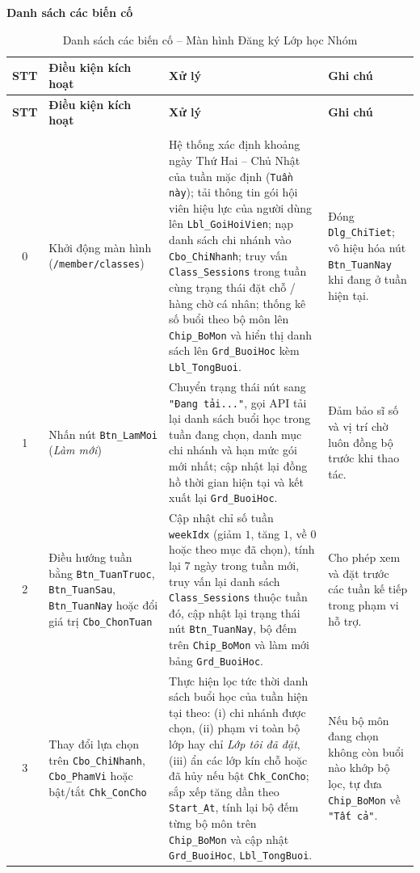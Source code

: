 \documentclass[a4paper,12pt]{article}
\begin{document}
\par\medskip\noindent\textbf{Danh sách các biến cố}\par\smallskip
{\footnotesize
\setlength{\tabcolsep}{4pt}
\begin{longtable}{|c|L{3.5cm}|L{7.8cm}|L{3.5cm}|}
\hline
\textbf{STT} & \textbf{Điều kiện kích hoạt} & \textbf{Xử lý} & \textbf{Ghi chú} \\
\hline
\endfirsthead
\hline
\textbf{STT} & \textbf{Điều kiện kích hoạt} & \textbf{Xử lý} & \textbf{Ghi chú} \\
\hline
\endhead
\hline
\endfoot
\hline
\caption{Danh sách các biến cố -- Màn hình Đăng ký Lớp học Nhóm} \\
\endlastfoot

0 & Khởi động màn hình (\texttt{/member/classes}) &
Hệ thống xác định khoảng ngày Thứ Hai -- Chủ Nhật của tuần mặc định (\texttt{Tuần này}); tải thông tin gói hội viên hiệu lực của người dùng lên \texttt{Lbl\_GoiHoiVien}; nạp danh sách chi nhánh vào \texttt{Cbo\_ChiNhanh}; truy vấn \texttt{Class\_Sessions} trong tuần cùng trạng thái đặt chỗ / hàng chờ cá nhân; thống kê số buổi theo bộ môn lên \texttt{Chip\_BoMon} và hiển thị danh sách lên \texttt{Grd\_BuoiHoc} kèm \texttt{Lbl\_TongBuoi}. &
Đóng \texttt{Dlg\_ChiTiet}; vô hiệu hóa nút \texttt{Btn\_TuanNay} khi đang ở tuần hiện tại. \\ \hline

1 & Nhấn nút \texttt{Btn\_LamMoi} (\textit{Làm mới}) &
Chuyển trạng thái nút sang \texttt{"Đang tải..."}, gọi API tải lại danh sách buổi học trong tuần đang chọn, danh mục chi nhánh và hạn mức gói mới nhất; cập nhật lại đồng hồ thời gian hiện tại và kết xuất lại \texttt{Grd\_BuoiHoc}. &
Đảm bảo sĩ số và vị trí chờ luôn đồng bộ trước khi thao tác. \\ \hline

2 & Điều hướng tuần bằng \texttt{Btn\_TuanTruoc}, \texttt{Btn\_TuanSau}, \texttt{Btn\_TuanNay} hoặc đổi giá trị \texttt{Cbo\_ChonTuan} &
Cập nhật chỉ số tuần \texttt{weekIdx} (giảm $1$, tăng $1$, về $0$ hoặc theo mục đã chọn), tính lại 7 ngày trong tuần mới, truy vấn lại danh sách \texttt{Class\_Sessions} thuộc tuần đó, cập nhật lại trạng thái nút \texttt{Btn\_TuanNay}, bộ đếm trên \texttt{Chip\_BoMon} và làm mới bảng \texttt{Grd\_BuoiHoc}. &
Cho phép xem và đặt trước các tuần kế tiếp trong phạm vi hỗ trợ. \\ \hline

3 & Thay đổi lựa chọn trên \texttt{Cbo\_ChiNhanh}, \texttt{Cbo\_PhamVi} hoặc bật/tắt \texttt{Chk\_ConCho} &
Thực hiện lọc tức thời danh sách buổi học của tuần hiện tại theo: (i) chi nhánh được chọn, (ii) phạm vi toàn bộ lớp hay chỉ \textit{Lớp tôi đã đặt}, (iii) ẩn các lớp kín chỗ hoặc đã hủy nếu bật \texttt{Chk\_ConCho}; sắp xếp tăng dần theo \texttt{Start\_At}, tính lại bộ đếm từng bộ môn trên \texttt{Chip\_BoMon} và cập nhật \texttt{Grd\_BuoiHoc}, \texttt{Lbl\_TongBuoi}. &
Nếu bộ môn đang chọn không còn buổi nào khớp bộ lọc, tự đưa \texttt{Chip\_BoMon} về \texttt{"Tất cả"}. \\ \hline


\end{longtable}}
\end{document}
